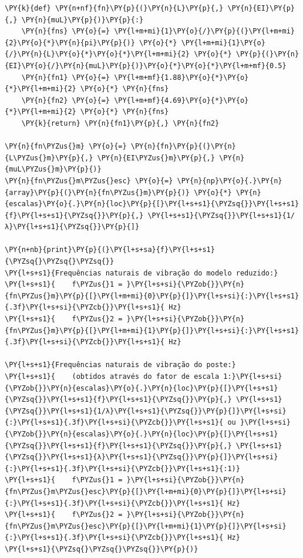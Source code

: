     \begin{tcolorbox}[breakable, size=fbox, boxrule=1pt, pad at break*=1mm,colback=cellbackground, colframe=cellborder]
\begin{Verbatim}[commandchars=\\\{\}]
\PY{k}{def} \PY{n+nf}{fn}\PY{p}{(}\PY{n}{L}\PY{p}{,} \PY{n}{EI}\PY{p}{,} \PY{n}{muL}\PY{p}{)}\PY{p}{:}
    \PY{n}{fns} \PY{o}{=} \PY{l+m+mi}{1}\PY{o}{/}\PY{p}{(}\PY{l+m+mi}{2}\PY{o}{*}\PY{n}{pi}\PY{p}{)} \PY{o}{*} \PY{l+m+mi}{1}\PY{o}{/}\PY{n}{L}\PY{o}{*}\PY{o}{*}\PY{l+m+mi}{2} \PY{o}{*} \PY{p}{(}\PY{n}{EI}\PY{o}{/}\PY{n}{muL}\PY{p}{)}\PY{o}{*}\PY{o}{*}\PY{l+m+mf}{0.5}
    \PY{n}{fn1} \PY{o}{=} \PY{l+m+mf}{1.88}\PY{o}{*}\PY{o}{*}\PY{l+m+mi}{2} \PY{o}{*} \PY{n}{fns}
    \PY{n}{fn2} \PY{o}{=} \PY{l+m+mf}{4.69}\PY{o}{*}\PY{o}{*}\PY{l+m+mi}{2} \PY{o}{*} \PY{n}{fns}
    \PY{k}{return} \PY{n}{fn1}\PY{p}{,} \PY{n}{fn2}

\PY{n}{fn\PYZus{}m} \PY{o}{=} \PY{n}{fn}\PY{p}{(}\PY{n}{L\PYZus{}m}\PY{p}{,} \PY{n}{EI\PYZus{}m}\PY{p}{,} \PY{n}{muL\PYZus{}m}\PY{p}{)}
\PY{n}{fn\PYZus{}m\PYZus{}esc} \PY{o}{=} \PY{n}{np}\PY{o}{.}\PY{n}{array}\PY{p}{(}\PY{n}{fn\PYZus{}m}\PY{p}{)} \PY{o}{*} \PY{n}{escalas}\PY{o}{.}\PY{n}{loc}\PY{p}{[}\PY{l+s+s1}{\PYZsq{}}\PY{l+s+s1}{f}\PY{l+s+s1}{\PYZsq{}}\PY{p}{,} \PY{l+s+s1}{\PYZsq{}}\PY{l+s+s1}{1/λ}\PY{l+s+s1}{\PYZsq{}}\PY{p}{]}

\PY{n+nb}{print}\PY{p}{(}\PY{l+s+sa}{f}\PY{l+s+s1}{\PYZsq{}\PYZsq{}\PYZsq{}}
\PY{l+s+s1}{Frequências naturais de vibração do modelo reduzido:}
\PY{l+s+s1}{    f\PYZus{}1 = }\PY{l+s+si}{\PYZob{}}\PY{n}{fn\PYZus{}m}\PY{p}{[}\PY{l+m+mi}{0}\PY{p}{]}\PY{l+s+si}{:}\PY{l+s+s1}{.3f}\PY{l+s+si}{\PYZcb{}}\PY{l+s+s1}{ Hz}
\PY{l+s+s1}{    f\PYZus{}2 = }\PY{l+s+si}{\PYZob{}}\PY{n}{fn\PYZus{}m}\PY{p}{[}\PY{l+m+mi}{1}\PY{p}{]}\PY{l+s+si}{:}\PY{l+s+s1}{.3f}\PY{l+s+si}{\PYZcb{}}\PY{l+s+s1}{ Hz}

\PY{l+s+s1}{Frequências naturais de vibração do poste:}
\PY{l+s+s1}{    (obtidos através do fator de escala 1:}\PY{l+s+si}{\PYZob{}}\PY{n}{escalas}\PY{o}{.}\PY{n}{loc}\PY{p}{[}\PY{l+s+s1}{\PYZsq{}}\PY{l+s+s1}{f}\PY{l+s+s1}{\PYZsq{}}\PY{p}{,} \PY{l+s+s1}{\PYZsq{}}\PY{l+s+s1}{1/λ}\PY{l+s+s1}{\PYZsq{}}\PY{p}{]}\PY{l+s+si}{:}\PY{l+s+s1}{.3f}\PY{l+s+si}{\PYZcb{}}\PY{l+s+s1}{ ou }\PY{l+s+si}{\PYZob{}}\PY{n}{escalas}\PY{o}{.}\PY{n}{loc}\PY{p}{[}\PY{l+s+s1}{\PYZsq{}}\PY{l+s+s1}{f}\PY{l+s+s1}{\PYZsq{}}\PY{p}{,} \PY{l+s+s1}{\PYZsq{}}\PY{l+s+s1}{λ}\PY{l+s+s1}{\PYZsq{}}\PY{p}{]}\PY{l+s+si}{:}\PY{l+s+s1}{.3f}\PY{l+s+si}{\PYZcb{}}\PY{l+s+s1}{:1)}
\PY{l+s+s1}{    f\PYZus{}1 = }\PY{l+s+si}{\PYZob{}}\PY{n}{fn\PYZus{}m\PYZus{}esc}\PY{p}{[}\PY{l+m+mi}{0}\PY{p}{]}\PY{l+s+si}{:}\PY{l+s+s1}{.3f}\PY{l+s+si}{\PYZcb{}}\PY{l+s+s1}{ Hz}
\PY{l+s+s1}{    f\PYZus{}2 = }\PY{l+s+si}{\PYZob{}}\PY{n}{fn\PYZus{}m\PYZus{}esc}\PY{p}{[}\PY{l+m+mi}{1}\PY{p}{]}\PY{l+s+si}{:}\PY{l+s+s1}{.3f}\PY{l+s+si}{\PYZcb{}}\PY{l+s+s1}{ Hz}
\PY{l+s+s1}{\PYZsq{}\PYZsq{}\PYZsq{}}\PY{p}{)}
\end{Verbatim}
\end{tcolorbox}


